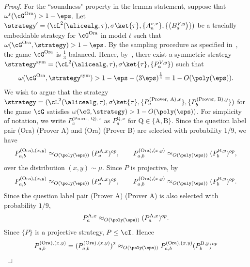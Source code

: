 \begin{proof}
For the ``soundness" property in the lemma statement, suppose that $\omega^t(\cG^{\text{Ora}}) > 1 - \eps$. Let $\strategy' =  (\cL^2(\alicealg, \tau), \sigma \ket{\tau},\{ A_{a}^{v, x} \},\{  \left(B_{a}^{V, y}\right) \})$ be a tracially embeddable strategy for $\cG^{\text{Ora}}$ in model $t$ such that $\omega(\cG^{\text{Ora}}, \strategy) > 1 - \eps$. By the sampling procedure as specified in~, the game $\cG^{\text{Ora}}$ is $\frac{1}{3}$-balanced. Hence, by~, there exist a symmetric strategy $\strategy^{\text{sym}} = ( \cL^2(\alicealg, \tau), \sigma \ket{\tau},\{ P_{a}^{V, y} \})$ such that 
\begin{equation} \label{eq:oracproofeq1}
	\omega(\cG^{\text{Ora}}, \strategy^{\text{sym}}) > 1 - \eps - \left(3 \eps \right)^{\frac{1}{4}} = 1- O(\poly(\eps)). 
\end{equation} 
We wish to argue that the strategy $\strategy = ( \cL^2(\alicealg, \tau), \sigma \ket{\tau},\{ P^{\text{(Prover, A)},x}_a \},\{  P^{\text{(Prover, B)},y}_b \} )$ for the game $\cG$ satisfies $\omega(\cG, \strategy) > 1 - O(\poly(\eps))$. For simplicity of notation, we write $P^{\text{(Prover, Q)},x}_a$ as $P^{\text{Q},x}_a$ for $\text{Q} \in \{\text{A},\text{B}\}$. Since the question label pair (Ora) \text{--} (Prover A) and  (Ora) \text{--} (Prover B) are selected with probability $1/9$,  we have 
\begin{align*}
	P^{\text{(Ora)},(x,y)}_{a,b} \simeq_{O(\poly(\eps))} ( P^{\text{A},x}_a)^{op}, \qquad P^{\text{(Ora)},(x,y)}_{a,b} \simeq_{O(\poly(\eps))} ( P^{\text{B},y}_b)^{op}, 
\end{align*}
over the distribution $(x,y) \sim \mu$. Since $P$ is projective, by~
\begin{equation}
	P^{\text{(Ora)},(x,y)}_{a,b} \approx_{O(\poly(\eps))} ( P^{\text{A},x}_a)^{op}, \qquad P^{\text{(Ora)},(x,y)}_{a,b} \approx_{O(\poly(\eps))} ( P^{\text{B},y}_b)^{op}.  \label{eq:oracproofeq2}
\end{equation}
Since the question label pair (Prover A) \text{--} (Prover A) is also selected with probability $1/9$, 
\begin{equation} 
	P^{\text{A},x}_a \approx_{O(\poly(\eps))}( P^{\text{A},x}_a)^{op}.  \label{eq:oracproofeq3}
\end{equation}
Since $\{ P \}$ is a projective strategy, $P \leq \cI$. Hence
\begin{align}
	\notag P^{\text{(Ora)},(x,y)}_{a,b} = (P^{\text{(Ora)},(x,y)}_{a,b})^2  &\approx_{O(\poly(\eps))} 	P^{\text{(Ora)},(x,y)}_{a,b} ( P^{\text{B},y}_b)^{op}\\

\end{align}
\end{proof}
